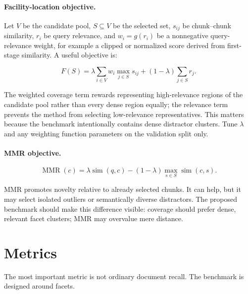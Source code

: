 \documentclass[11pt,a4paper]{article}
\begin{document}
\paragraph{Facility-location objective.}
Let $V$ be the candidate pool, $S \subseteq V$ be the selected set, $s_{ij}$ be chunk--chunk similarity, $r_i$ be query relevance, and $w_i=g(r_i)$ be a nonnegative query-relevance weight, for example a clipped or normalized score derived from first-stage similarity. A useful objective is:

\[
	F(S) = \lambda \sum_{i \in V} w_i \max_{j \in S} s_{ij} + (1-\lambda) \sum_{j \in S} r_j.
\]

The weighted coverage term rewards representing high-relevance regions of the candidate pool rather than every dense region equally; the relevance term prevents the method from selecting low-relevance representatives. This matters because the benchmark intentionally contains dense distractor clusters. Tune $\lambda$ and any weighting function parameters on the validation split only.

\paragraph{MMR objective.}

\[
	\operatorname{MMR}(c) = \lambda \operatorname{sim}(q,c) - (1-\lambda)\max_{s \in S}\operatorname{sim}(c,s).
\]

MMR promotes novelty relative to already selected chunks. It can help, but it may select isolated outliers or semantically diverse distractors. The proposed benchmark should make this difference visible: coverage should prefer dense, relevant facet clusters; MMR may overvalue mere distance.

\section{Metrics}

The most important metric is not ordinary document recall. The benchmark is designed around facets.
\end{document}
